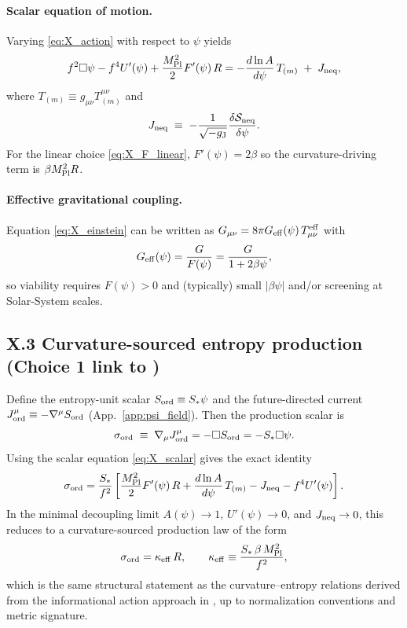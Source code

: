 \documentclass[10pt]{article}
\begin{document}
\paragraph{Scalar equation of motion.}
Varying \eqref{eq:X_action} with respect to $\psi$ yields
\begin{equation}
f^{2}\Box\psi - f^{4}U'(\psi) + \frac{M_{\rm Pl}^{2}}{2}F'(\psi)\,R
=
-\frac{d\ln A}{d\psi}\,T_{(m)}
\;+\;
J_{\rm neq},
\label{eq:X_scalar}
\end{equation}
where $T_{(m)}\equiv g_{\mu\nu}T_{(m)}^{\mu\nu}$ and
\begin{equation}
J_{\rm neq}\;\equiv\;-\frac{1}{\sqrt{-g_{\mathrm{J}}}}\frac{\delta \mathcal{S}_{\rm neq}}{\delta\psi}.
\label{eq:X_Jneq}
\end{equation}
For the linear choice \eqref{eq:X_F_linear}, $F'(\psi)=2\beta$ so the curvature-driving term is $\beta M_{\rm Pl}^{2}R$.

\paragraph{Effective gravitational coupling.}
Equation \eqref{eq:X_einstein} can be written as $G_{\mu\nu}=8\pi G_{\rm eff}(\psi)\,T^{\rm eff}_{\mu\nu}$ with
\begin{equation}
G_{\rm eff}(\psi)=\frac{G}{F(\psi)}=\frac{G}{1+2\beta\psi},
\label{eq:X_Geff}
\end{equation}
so viability requires $F(\psi)>0$ and (typically) small $|\beta\psi|$ and/or screening at Solar-System scales.

\subsection{X.3 Curvature-sourced entropy production (Choice 1 link to \cite{NeukartMarxVinokur2026ISL})}

Define the entropy-unit scalar $S_{\rm ord}\equiv S_\ast\psi$ and the future-directed current
$J^\mu_{\rm ord}\equiv-\nabla^\mu S_{\rm ord}$ (App.~\ref{app:psi_field}).
Then the production scalar is
\begin{equation}
\sigma_{\rm ord}\;\equiv\;\nabla_\mu J^\mu_{\rm ord}
=
-\Box S_{\rm ord}
=
- S_\ast \Box\psi.
\label{eq:X_sigma_def}
\end{equation}
Using the scalar equation \eqref{eq:X_scalar} gives the exact identity
\begin{equation}
\sigma_{\rm ord}
=
\frac{S_\ast}{f^{2}}\left[
\frac{M_{\rm Pl}^{2}}{2}F'(\psi)\,R
+
\frac{d\ln A}{d\psi}\,T_{(m)}
-
J_{\rm neq}
-
f^{4}U'(\psi)
\right].
\label{eq:X_sigma_general}
\end{equation}
In the minimal decoupling limit $A(\psi)\to 1$, $U'(\psi)\to 0$, and $J_{\rm neq}\to 0$,
this reduces to a curvature-sourced production law of the form
\begin{equation}
\sigma_{\rm ord}=\kappa_{\rm eff}\,R,
\qquad
\kappa_{\rm eff}\equiv \frac{S_\ast\,\beta\,M_{\rm Pl}^{2}}{f^{2}},
\label{eq:X_sigma_curvature}
\end{equation}
which is the same structural statement as the curvature--entropy relations derived from the informational
action approach in \cite{NeukartMarxVinokur2026ISL}, up to normalization conventions and metric signature.
\end{document}
